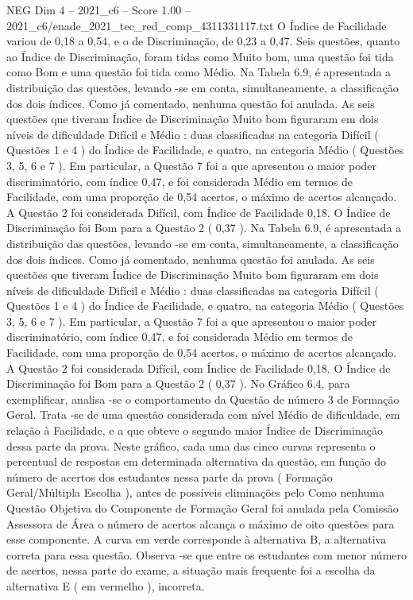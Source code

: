 \begin{textsample}{NEG Dim 4 – 2021\_c6 – Score 1.00 – 2021\_c6/enade\_2021\_tec\_red\_comp\_4311331117.txt}
O Índice de Facilidade variou de 0,18 a 0,54, e o de Discriminação, de 0,23 a 0,47.
Seis questões, quanto ao Índice de Discriminação, foram tidas como Muito bom, uma questão foi tida como Bom e uma questão foi tida como Médio.
Na Tabela 6.9, é apresentada a distribuição das questões, levando -se em conta, simultaneamente, a classificação dos dois índices.
Como já comentado, nenhuma questão foi anulada.
As seis questões que tiveram Índice de Discriminação Muito bom figuraram em dois níveis de dificuldade Difícil e Médio : duas classificadas na categoria Difícil ( Questões 1 e 4 ) do Índice de Facilidade, e quatro, na categoria Médio ( Questões 3, 5, 6 e 7 ).
Em particular, a Questão 7 foi a que apresentou o maior poder discriminatório, com índice 0,47, e foi considerada Médio em termos de Facilidade, com uma proporção de 0,54 acertos, o máximo de acertos alcançado.
A Questão 2 foi considerada Difícil, com Índice de Facilidade 0,18.
O Índice de Discriminação foi Bom para a Questão 2 ( 0,37 ).
Na Tabela 6.9, é apresentada a distribuição das questões, levando -se em conta, simultaneamente, a classificação dos dois índices.
Como já comentado, nenhuma questão foi anulada.
As seis questões que tiveram Índice de Discriminação Muito bom figuraram em dois níveis de dificuldade Difícil e Médio : duas classificadas na categoria Difícil ( Questões 1 e 4 ) do Índice de Facilidade, e quatro, na categoria Médio ( Questões 3, 5, 6 e 7 ).
Em particular, a Questão 7 foi a que apresentou o maior poder discriminatório, com índice 0,47, e foi considerada Médio em termos de Facilidade, com uma proporção de 0,54 acertos, o máximo de acertos alcançado.
A Questão 2 foi considerada Difícil, com Índice de Facilidade 0,18.
O Índice de Discriminação foi Bom para a Questão 2 ( 0,37 ).
No Gráfico 6.4, para exemplificar, analisa -se o comportamento da Questão de número 3 de Formação Geral.
Trata -se de uma questão considerada com nível Médio de dificuldade, em relação à Facilidade, e a que obteve o segundo maior Índice de Discriminação dessa parte da prova.
Neste gráfico, cada uma das cinco curvas representa o percentual de respostas em determinada alternativa da questão, em função do número de acertos dos estudantes nessa parte da prova ( Formação Geral/Múltipla Escolha ), antes de possíveis eliminações pelo Como nenhuma Questão Objetiva do Componente de Formação Geral foi anulada pela Comissão Assessora de Área o número de acertos alcança o máximo de oito questões para esse componente.
A curva em verde corresponde à alternativa B, a alternativa correta para essa questão.
Observa -se que entre os estudantes com menor número de acertos, nessa parte do exame, a situação mais frequente foi a escolha da alternativa E ( em vermelho ), incorreta.

\end{textsample}

